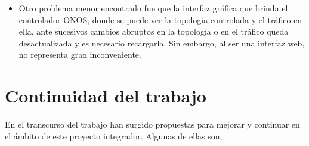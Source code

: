 \begin{itemize}
    \item Otro problema menor encontrado fue que la interfaz gráfica que brinda el controlador ONOS, donde se puede ver la topología controlada y el tráfico en ella, ante sucesivos cambios abruptos en la topología o en el tráfico queda desactualizada y es necesario recargarla. Sin embargo, al ser una interfaz web, no representa gran inconveniente.
    
\end{itemize}

\section{Continuidad del trabajo} %

En el transcurso del trabajo han surgido propuestas para mejorar y continuar en el ámbito de este proyecto integrador. Algunas de ellas son,

